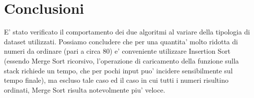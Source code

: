 \documentclass[a4paper]{article}
\begin{document}
\section{Conclusioni}
E' stato verificato il comportamento dei due algoritmi al variare della tipologia di dataset utilizzati. Possiamo concludere che per una quantita' molto ridotta di numeri da ordinare (pari a circa 80) e' conveniente utilizzare Insertion Sort (essendo Merge Sort ricorsivo, l'operazione di caricamento della funzione sulla stack richiede un tempo, che per pochi input puo' incidere sensibilmente sul tempo finale), ma escluso tale caso ed il caso in cui tutti i numeri risultino ordinati, Merge Sort risulta notevolmente piu' veloce.
\end{document}
